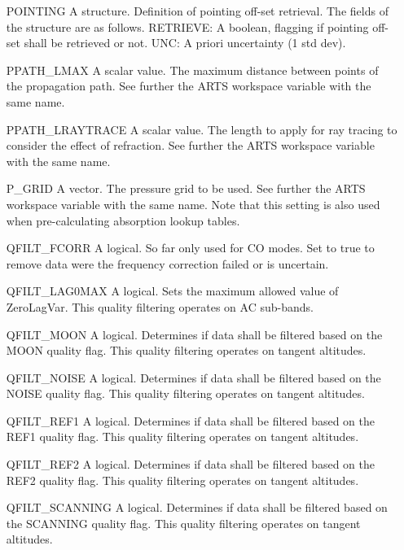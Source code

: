 \begin{changemargin}{2.5cm}{0.0cm}
\begin{itemize}
\item[{POINTING}] 
A structure. Definition of pointing off-set retrieval. The fields of the
structure are as follows. RETRIEVE: A boolean, flagging if pointing off-set
shall be retrieved or not. UNC: A priori uncertainty (1 std dev).

\item[{PPATH\_LMAX}] 
A scalar value. The maximum distance between points of the propagation path.
See further the ARTS workspace variable with the same name.

\item[{PPATH\_LRAYTRACE}] 
A scalar value. The length to apply for ray tracing to consider the effect
of refraction. See further the ARTS workspace variable with the same name.

\item[{P\_GRID}] 
A vector. The pressure grid to be used. See further the ARTS workspace
variable with the same name. Note that this setting is also used when
pre-calculating absorption lookup tables.

\item[{QFILT\_FCORR}] 
A logical. So far only used for CO modes. Set to true to remove data were
the frequency correction failed or is uncertain.

\item[{QFILT\_LAG0MAX}] 
A logical. Sets the maximum allowed value of ZeroLagVar. This quality
filtering operates on AC sub-bands.

\item[{QFILT\_MOON}] 
A logical. Determines if data shall be filtered based on the MOON quality
flag. This quality filtering operates on tangent altitudes.

\item[{QFILT\_NOISE}] 
A logical. Determines if data shall be filtered based on the NOISE quality
flag. This quality filtering operates on tangent altitudes.

\item[{QFILT\_REF1}] 
A logical. Determines if data shall be filtered based on the REF1 quality
flag. This quality filtering operates on tangent altitudes.

\item[{QFILT\_REF2}] 
A logical. Determines if data shall be filtered based on the REF2 quality
flag. This quality filtering operates on tangent altitudes.

\item[{QFILT\_SCANNING}] 
A logical. Determines if data shall be filtered based on the SCANNING quality
flag. This quality filtering operates on tangent altitudes.


\end{itemize}
\end{changemargin}
